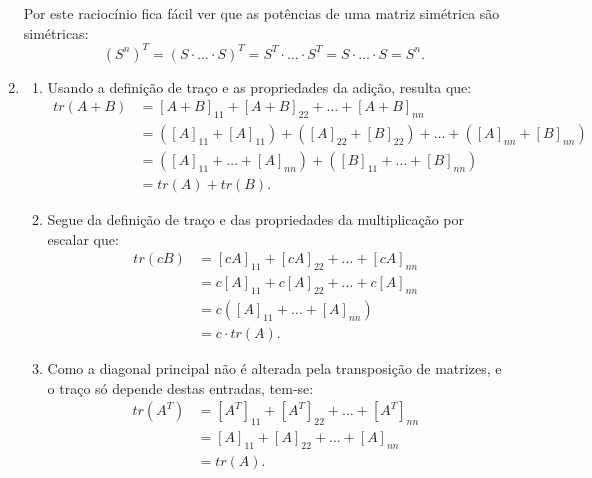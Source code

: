 \documentclass[12pt,a4paper]{article}
\begin{document}
\begin{enumerate}
Por este raciocínio fica fácil ver que as potências de uma matriz simétrica são simétricas:
\[
(S^n)^T
= (S \cdot \ldots \cdot S)^T
= S^T \cdot \ldots \cdot S^T
= S \cdot \ldots \cdot S = S^n.
\]

\item
\begin{enumerate}
\item Usando a definição de traço e as propriedades da adição, resulta que:
\begin{align*}
tr(A+B)
& = [A+B]_{11} + [A+B]_{22} + \ldots + [A+B]_{nn} \\
& = ([A]_{11} + [A]_{11}) + ([A]_{22} + [B]_{22}) + \ldots + ([A]_{nn} + [B]_{nn}) \\
& = ([A]_{11} + \dots + [A]_{nn}) + ([B]_{11} + \ldots + [B]_{nn})\\
& = tr(A)+tr(B).
\end{align*}
\item Segue da definição de traço e das propriedades da multiplicação por escalar que:
\begin{align*}
tr(cB)
& = [cA]_{11} + [cA]_{22} + \ldots + [cA]_{nn} \\
& = c[A]_{11} + c[A]_{22} + \ldots + c[A]_{nn} \\
& = c([A]_{11} + \dots + [A]_{nn}) \\
& = c \cdot tr(A).
\end{align*}
\item Como a diagonal principal não é alterada pela transposição de matrizes, e o traço só depende destas entradas, tem-se:
\begin{align*}
tr(A^T)
& = [A^T]_{11} + [A^T]_{22} + \ldots + [A^T]_{nn} \\
& = [A]_{11} + [A]_{22} + \ldots + [A]_{nn} \\
& = tr(A).
\end{align*}
\end{enumerate}
\end{enumerate}
\end{document}

